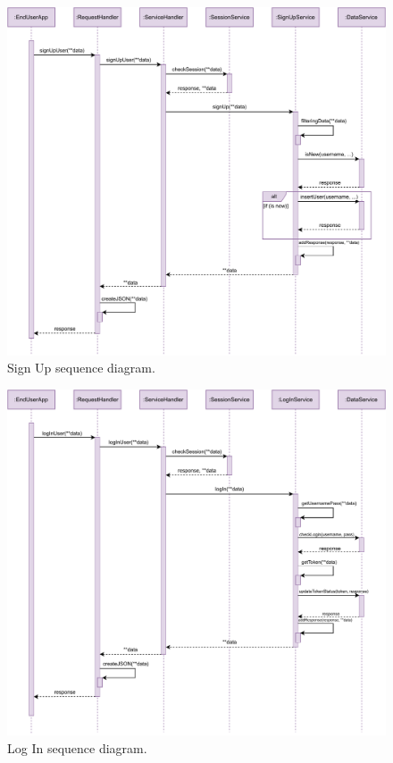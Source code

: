 \begin{figure}[H]
	\centering
	\includegraphics[width=1.0\textwidth]{images/signUp_sequence_diagram.pdf}
	\caption{Sign Up sequence diagram.}
\end{figure}

\begin{figure}[H]
	\centering
	\includegraphics[width=1.0\textwidth]{images/logIn_sequence_diagram.pdf}
	\caption{Log In sequence diagram.}
\end{figure}


